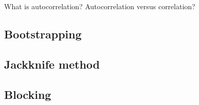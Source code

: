 What is autocorrelation? Autocorrelation versus correlation?
\subsection{Bootstrapping}
\subsection{Jackknife method}
\subsection{Blocking}
